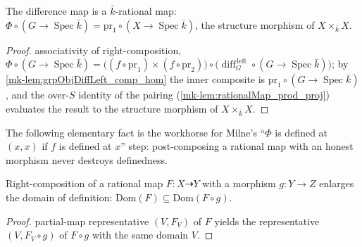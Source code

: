 \begin{lemma}\label{mk-lem:rationalMap_difference_over}
  \leanok

  The difference map is a \(\bar k\)-rational map: \(\Phi \circ (G \to \operatorname{Spec}\bar k)
  = \mathrm{pr}_1 \circ (X \to \operatorname{Spec}\bar k)\), the structure morphism of
  \(X \times_{\bar k} X\).
\end{lemma}
\begin{proof}
  \leanokBy associativity of right-composition, \(\Phi \circ (G \to \operatorname{Spec}\bar k) =
  \bigl((f \circ \mathrm{pr}_1) \times (f \circ \mathrm{pr}_2)\bigr) \circ
  \bigl(\operatorname{diff}_G^{\,\mathrm{left}} \circ (G \to \operatorname{Spec}\bar k)\bigr)\);
  by \ref{mk-lem:grpObjDiffLeft_comp_hom} the inner composite is
  \(\mathrm{pr}_1 \circ (G \to \operatorname{Spec}\bar k)\), and the over-\(S\) identity of the
  pairing (\ref{mk-lem:rationalMap_prod_proj}) evaluates the result to the structure morphism of
  \(X \times_{\bar k} X\).
\end{proof}

The following elementary fact is the workhorse for Milne's ``\(\Phi\) is defined at
\((x,x)\) if \(f\) is defined at \(x\)'' step: post-composing a rational map with an
honest morphism never destroys definedness.

\begin{lemma}\label{mk-lem:compHom_domain_monotone}
  \leanok

  Right-composition of a rational map \(F \colon X \dashrightarrow Y\) with a morphism
  \(g \colon Y \to Z\) enlarges the domain of definition:
  \(\mathrm{Dom}(F) \subseteq \mathrm{Dom}(F \circ g)\).
\end{lemma}
\begin{proof}
  \leanokA partial-map representative \((V, F_V)\) of \(F\) yields the representative
  \((V, F_V \circ g)\) of \(F \circ g\) with the same domain \(V\).
\end{proof}

